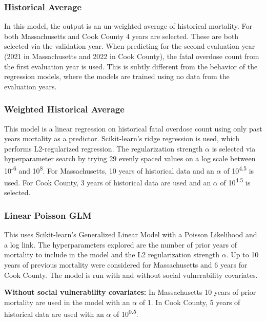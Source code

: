\subsubsection{Historical Average}\label{historical-average}

In this model, the output is an un-weighted average of historical mortality. For both Massachusetts and Cook County 4 years are selected. These are both selected via the validation year. When predicting for the second evaluation year (2021 in Massachusetts and 2022 in Cook County), the fatal overdose count from the first evaluation year is used. This is subtly different from the behavior of the regression models, where the models are trained using no data from the evaluation years.

\subsubsection{Weighted Historical Average}\label{weighted-historical-average}

This model is a linear regression on historical fatal overdose count using only past years mortality as a predictor. Scikit-learn's\citep{buitinckAPIDesignMachine2013} ridge regression is used, which performs L2-regularized regression. The regularization strength $\alpha$ is selected via hyperparameter search by trying 29 evenly spaced values on a log scale between 10\textsuperscript{-6} and 10\textsuperscript{8}. For Massachusetts, 10 years of historical data and an $\alpha$ of 10\textsuperscript{4.5} is used. For Cook County, 3 years of historical data are used and an $\alpha$ of 10\textsuperscript{4.5} is selected.

\subsubsection{Linear Poisson GLM}\label{linear-poisson-glm}

This uses Scikit-learn's\citep{buitinckAPIDesignMachine2013} Generalized Linear Model with a Poisson Likelihood and a log link. The hyperparameters explored are the number of prior years of mortality to include in the model and the L2 regularization strength $\alpha$. Up to 10 years of previous mortality were considered for Massachusetts and 6 years for Cook County. The model is run with and without social vulnerability covariates.

\textbf{Without social vulnerability covariates:} In Massachusetts 10 years of prior mortality are used in the model with an $\alpha$ of 1. In Cook County, 5 years of historical data are used with an $\alpha$ of 10\textsuperscript{0.5}.


